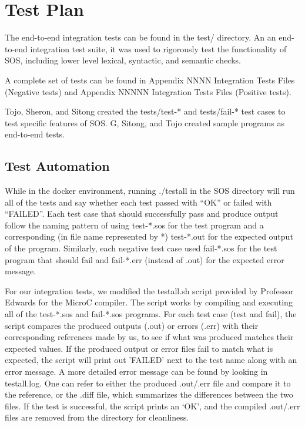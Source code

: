 \documentclass[main.tex]{subfiles}
\begin{document}
	\section{Test Plan}
	
	The end-to-end integration tests can be found in the test/ directory. An an end-to-end integration test suite, it was used to rigorously test the functionality of SOS, including lower level lexical, syntactic, and semantic checks. %
	
	A complete set of tests can be found in Appendix NNNN Integration Tests Files (Negative tests) and Appendix NNNNN Integration Tests Files (Positive tests).
	
	Tojo, Sheron, and Sitong created the tests/test-* and tests/fail-* test cases to test specific features of SOS. G, Sitong, and Tojo created sample programs as end-to-end tests.
	
	\subsection{Test Automation}
	
	While in the docker environment, running ./testall in the SOS directory will run all of the tests and say whether each test passed with “OK” or failed with “FAILED”. Each test case that should successfully pass and produce output follow the naming pattern of using test-*.sos for the test program and a corresponding (in file name represented by *) test-*.out for the expected output of the program. Similarly, each negative test case used fail-*.sos for the test program that should fail and fail-*.err (instead of .out) for the expected error message.

	For our integration tests, we modified the testall.sh script provided by Professor Edwards for the MicroC compiler. The script works by compiling and executing all of the test-*.sos and fail-*.sos programs. For each test case (test and fail), the script compares the produced outputs (.out) or errors (.err) with their corresponding references made by us, to see if what was produced  matches their expected values. If the produced output or error files fail to match what is expected, the script will print out 'FAILED' next to the test name along with an error message. A more detailed error message can be found by looking in testall.log. One can refer to either the produced .out/.err file and compare it to the reference, or the .diff file, which summarizes the differences between the two files. If the test is successful, the script prints an ‘OK’, and the compiled .out/.err files are removed from the directory for cleanliness.
	
\end{document}
